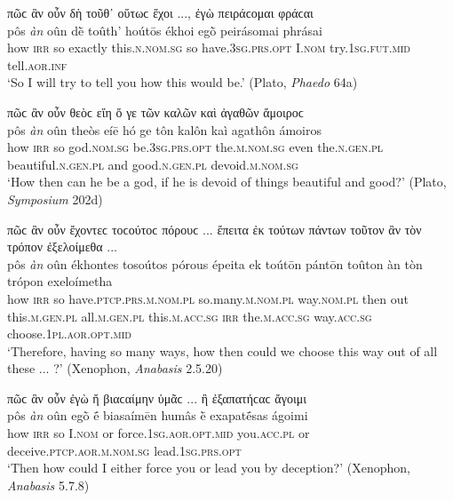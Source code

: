 \begin{exe}
\ex πῶϲ ἂν οὖν δὴ τοῦθ᾽ οὕτωϲ ἔχοι ..., ἐγὼ πειράϲομαι φράϲαι\\
\gll pôs \emph{àn} oûn dḕ toûth' hoútōs ékhoi egṑ peirásomai phrásai\\
how \textsc{irr} so exactly this.\textsc{n.nom.sg} so have.\textsc{3sg.prs.opt} I.\textsc{nom} try.\textsc{1sg.fut.mid} tell.\textsc{aor.inf}\\
\trans `So I will try to tell you how this would be.' (Plato, \textit{Phaedo} 64a)
\label{displace4}
\end{exe}

\begin{exe}
\ex πῶϲ ἂν οὖν θεὸϲ εἴη ὅ γε τῶν καλῶν καὶ ἀγαθῶν ἄμοιροϲ\\
\gll pôs \emph{àn} oûn theòs eíē hó ge tôn kalôn kaì agathôn ámoiros\\
how \textsc{irr} so god.\textsc{nom.sg} be.\textsc{3sg.prs.opt} the.\textsc{m.nom.sg} even the.\textsc{n.gen.pl} beautiful.\textsc{n.gen.pl} and good.\textsc{n.gen.pl} devoid.\textsc{m.nom.sg}\\
\trans `How then can he be a god, if he is devoid of things beautiful and good?' (Plato, \textit{Symposium} 202d)
\label{displace5}
\end{exe}

\begin{exe}
\ex πῶϲ ἂν οὖν ἔχοντεϲ τοϲούτοϲ πόρουϲ ... ἔπειτα ἐκ τούτων πάντων τοῦτον ἂν τὸν τρόπον ἐξελοίμεθα ...\\
\gll pôs \emph{àn} oûn ékhontes tosoútos pórous épeita ek toútōn pántōn toûton àn tòn trópon exeloímetha\\
how \textsc{irr} so have.\textsc{ptcp.prs.m.nom.pl} so.many.\textsc{m.nom.pl} way.\textsc{nom.pl} then out this.\textsc{m.gen.pl} all.\textsc{m.gen.pl} this.\textsc{m.acc.sg} \textsc{irr} the.\textsc{m.acc.sg} way.\textsc{acc.sg} choose.\textsc{1pl.aor.opt.mid}\\
\trans `Therefore, having so many ways, how then could we choose this way out of all these ... ?' (Xenophon, \textit{Anabasis} 2.5.20)
\label{displace6}
\end{exe}

\begin{exe}
\ex πῶϲ ἂν οὖν ἐγὼ ἤ βιαϲαίμην ὑμᾶϲ ... ἢ ἐξαπατήϲαϲ ἄγοιμι\\
\gll pôs \emph{àn} oûn egṑ ḗ biasaímēn humâs ḕ exapatḗsas ágoimi\\
how \textsc{irr} so I.\textsc{nom} or force.\textsc{1sg.aor.opt.mid} you.\textsc{acc.pl} or deceive.\textsc{ptcp.aor.m.nom.sg} lead.\textsc{1sg.prs.opt}\\
\trans `Then how could I either force you or lead you by deception?' (Xenophon, \textit{Anabasis} 5.7.8)
\label{displace7}
\end{exe}

